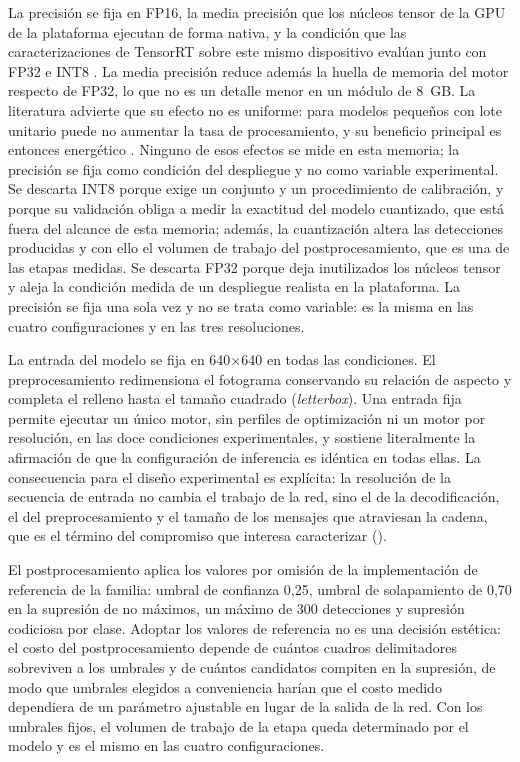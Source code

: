 La precisión se fija en FP16, la media precisión que los núcleos tensor de la
GPU de la plataforma ejecutan de forma nativa, y la condición que las
caracterizaciones de TensorRT sobre este mismo dispositivo evalúan junto con
FP32 e INT8 \cite{szegedi2026, tang2026}. La media precisión reduce además
la huella de memoria del motor respecto de FP32, lo que no es un detalle
menor en un módulo de 8~GB. La literatura advierte que su efecto no es
uniforme: para modelos pequeños con lote unitario puede no aumentar la tasa
de procesamiento, y su beneficio principal es entonces energético
\cite{tang2026}. Ninguno de esos efectos se mide en esta memoria; la
precisión se fija como condición del despliegue y no como variable
experimental. Se descarta INT8 porque exige un conjunto y un procedimiento de
calibración, y porque su validación obliga a medir la exactitud del modelo
cuantizado, que está fuera del alcance de esta memoria; además, la
cuantización altera las detecciones producidas y con ello el volumen de
trabajo del postprocesamiento, que es una de las etapas medidas. Se descarta
FP32 porque deja inutilizados los núcleos tensor y aleja la condición medida
de un despliegue realista en la plataforma. La precisión se fija una sola vez
y no se trata como variable: es la misma en las cuatro configuraciones y en las
tres resoluciones.

La entrada del modelo se fija en 640$\times$640 en todas las condiciones. El
preprocesamiento redimensiona el fotograma conservando su relación de aspecto
y completa el relleno hasta el tamaño cuadrado (\emph{letterbox}). Una
entrada fija permite ejecutar un único motor, sin perfiles de optimización ni
un motor por resolución, en las doce condiciones experimentales, y sostiene
literalmente la afirmación de que la configuración de inferencia es idéntica
en todas ellas. La consecuencia para el diseño experimental es explícita: la
resolución de la secuencia de entrada no cambia el trabajo de la red, sino el
de la decodificación, el del preprocesamiento y el tamaño de los mensajes que
atraviesan la cadena, que es el término del compromiso que interesa
caracterizar ().

El postprocesamiento aplica los valores por omisión de la implementación de
referencia de la familia: umbral de confianza 0,25, umbral de solapamiento de
0,70 en la supresión de no máximos, un máximo de 300 detecciones y supresión
codiciosa por clase. Adoptar los valores de referencia no es una decisión
estética: el costo del postprocesamiento depende de cuántos cuadros
delimitadores sobreviven a los umbrales y de cuántos candidatos compiten en
la supresión, de modo que umbrales elegidos a conveniencia harían que el
costo medido dependiera de un parámetro ajustable en lugar de la salida de la
red. Con los umbrales fijos, el volumen de trabajo de la etapa queda
determinado por el modelo y es el mismo en las cuatro configuraciones.

